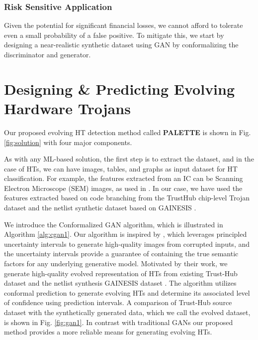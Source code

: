\fi 


\subsubsection*{Risk Sensitive Application} Given the potential for significant financial losses, we cannot afford to tolerate even a small probability of a false positive. To mitigate this, we start by designing a near-realistic synthetic dataset using GAN by conformalizing the discriminator and generator. 


\section*{Designing \& Predicting Evolving Hardware Trojans}
\label{sec:Solution}
Our proposed evolving HT detection method called \textbf{PALETTE} is shown in Fig. \ref{fig:solution} with four major components.

 As with any ML-based solution, the first step is to extract the dataset, and in the case of HTs, we can have images, tables, and graphs as input dataset for HT classification. For example, the features extracted from an IC can be Scanning Electron Microscope (SEM) images, as used in \cite{vashistha2018trojan,shi2019golden}. %
In our case, we have used the features extracted based on code branching from the TrustHub chip-level Trojan dataset \cite{px6s-sm21-22} and the netlist synthetic dataset based on GAINESIS \cite{liakos2022gainesis}. 

 We introduce the Conformalized GAN algorithm, which is illustrated in Algorithm \ref{alg:cgan1}. Our algorithm is inspired by \cite{sankaranarayanan2022semantic}, which leverages principled uncertainty intervals to generate high-quality images from corrupted inputs, and the uncertainty intervals provide a guarantee of containing the true semantic factors for any underlying generative model. Motivated by their work, we generate high-quality evolved representation of HTs from existing Trust-Hub dataset \cite{px6s-sm21-22} and the netlist synthesis GAINESIS dataset \cite{liakos2022gainesis}. 
The algorithm utilizes conformal prediction to generate evolving HTs and determine its associated level of confidence using prediction intervals. A comparison of Trust-Hub source dataset with the synthetically generated data, which we call the evolved dataset, is shown in Fig. \ref{fig:gan1}. In contrast with traditional GANs our proposed method provides a more reliable means for generating evolving HTs.  

